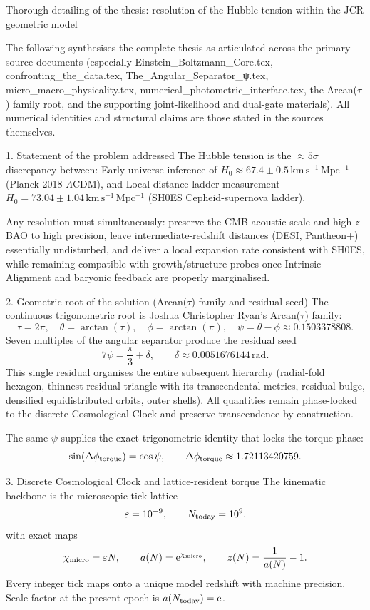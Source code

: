 Thorough detailing of the thesis: resolution of the Hubble tension within the JCR geometric model

The following synthesises the complete thesis as articulated across the primary source documents (especially Einstein_Boltzmann_Core.tex, confronting_the_data.tex, The_Angular_Separator_ψ.tex, micro_macro_physicality.tex, numerical_photometric_interface.tex, the Arcan(\(\tau\)) family root, and the supporting joint-likelihood and dual-gate materials). All numerical identities and structural claims are those stated in the sources themselves.

1. Statement of the problem addressed
The Hubble tension is the \(\approx 5\sigma\) discrepancy between:
Early-universe inference of \(H_0 \approx 67.4 \pm 0.5\,\mathrm{km\,s^{-1}\,Mpc^{-1}}\) (Planck 2018 \(\Lambda\)CDM), and
Local distance-ladder measurement \(H_0 = 73.04 \pm 1.04\,\mathrm{km\,s^{-1}\,Mpc^{-1}}\) (SH0ES Cepheid-supernova ladder).

Any resolution must simultaneously:
preserve the CMB acoustic scale and high-\(z\) BAO to high precision,
leave intermediate-redshift distances (DESI, Pantheon+) essentially undisturbed,
and deliver a local expansion rate consistent with SH0ES,
while remaining compatible with growth/structure probes once Intrinsic Alignment and baryonic feedback are properly marginalised.

2. Geometric root of the solution (Arcan(\(\tau\)) family and residual seed)
The continuous trigonometric root is Joshua Christopher Ryan’s Arcan(\(\tau\)) family:
\[
\tau = 2\pi,\quad
\theta = \arctan(\tau),\quad
\phi = \arctan(\pi),\quad
\psi = \theta - \phi \approx 0.1503378808.
\]
Seven multiples of the angular separator produce the residual seed
\[
7\psi = \frac{\pi}{3} + \delta,\qquad \delta \approx 0.0051676144\,\mathrm{rad}.
\]
This single residual organises the entire subsequent hierarchy (radial-fold hexagon, thinnest residual triangle with its transcendental metrics, residual bulge, densified equidistributed orbits, outer shells). All quantities remain phase-locked to the discrete Cosmological Clock and preserve transcendence by construction.

The same \(\psi\) supplies the exact trigonometric identity that locks the torque phase:
\[
\sin(\Delta\phi_{\rm torque}) = \cos\psi,\qquad \Delta\phi_{\rm torque} \approx 1.72113420759.
\]

3. Discrete Cosmological Clock and lattice-resident torque
The kinematic backbone is the microscopic tick lattice
\[
\varepsilon = 10^{-9},\qquad N_{\rm today} = 10^9,
\]
with exact maps
\[
\chi_{\rm micro} = \varepsilon N,\qquad a(N) = \mathrm{e}^{\chi_{\rm micro}},\qquad z(N) = \frac{1}{a(N)}-1.
\]
Every integer tick maps onto a unique model redshift with machine precision. Scale factor at the present epoch is \(a(N_{\rm today}) = \mathrm{e}\).

